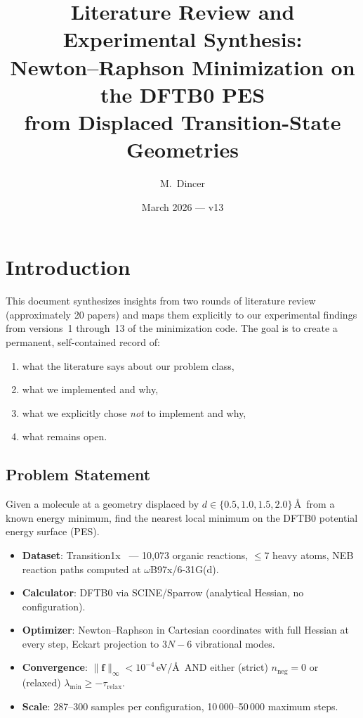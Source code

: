 \documentclass[11pt,a4paper]{article}
\title{Literature Review and Experimental Synthesis:\\
  Newton--Raphson Minimization on the DFTB0 PES\\
  from Displaced Transition-State Geometries}
\author{M.\ Dincer}
\date{March 2026 --- v13}
\newcommand{\vect}[1]{\bm{#1}}
\newcommand{\norm}[1]{\lVert #1 \rVert}
\theoremstyle{definition}
\begin{document}
\maketitle

\tableofcontents
\newpage

\section{Introduction}
\label{sec:intro}

This document synthesizes insights from two rounds of literature review
(approximately 20 papers) and maps them explicitly to our experimental
findings from versions~1 through~13 of the minimization code.
The goal is to create a permanent, self-contained record of:
\begin{enumerate}[nosep]
  \item what the literature says about our problem class,
  \item what we implemented and why,
  \item what we explicitly chose \emph{not} to implement and why,
  \item what remains open.
\end{enumerate}

\subsection{Problem Statement}

Given a molecule at a geometry displaced by $d \in \{0.5, 1.0, 1.5, 2.0\}$\,\AA\
from a known energy minimum, find the nearest local minimum on the DFTB0
potential energy surface (PES).
\begin{itemize}[nosep]
  \item \textbf{Dataset}: Transition1x~\citep{transition1x} --- 10,073 organic
    reactions, $\leq 7$ heavy atoms, NEB reaction paths computed at
    $\omega$B97x/6-31G(d).
  \item \textbf{Calculator}: DFTB0 via SCINE/Sparrow (analytical Hessian, no
    configuration).
  \item \textbf{Optimizer}: Newton--Raphson in Cartesian coordinates with full
    Hessian at every step, Eckart projection to $3N{-}6$ vibrational modes.
  \item \textbf{Convergence}: $\norm{\vect{f}}_\infty < 10^{-4}$\,eV/\AA\
    AND either (strict) $n_\text{neg} = 0$ or (relaxed) $\lambda_\text{min}
    \geq -\tau_\text{relax}$.
  \item \textbf{Scale}: 287--300 samples per configuration, 10\,000--50\,000
    maximum steps.
\end{itemize}
\end{document}
